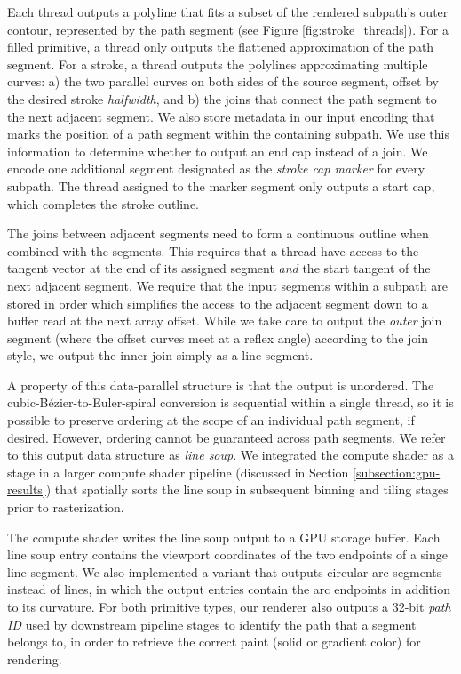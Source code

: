 \documentclass[sigconf]{acmart}
\begin{document}
Each thread outputs a polyline that fits a subset of the rendered subpath's outer contour, represented by the path segment (see Figure \ref{fig:stroke_threads}). For a filled primitive, a thread only outputs the flattened approximation of the path segment. For a stroke, a thread outputs the polylines approximating multiple curves: a) the two parallel curves on both sides of the source segment, offset by the desired stroke \emph{halfwidth}, and b) the joins that connect the path segment to the next adjacent segment. We also store metadata in our input encoding that marks the position of a path segment within the containing subpath. We use this information to determine whether to output an end cap instead of a join. We encode one additional segment designated as the \emph{stroke cap marker} for every subpath. The thread assigned to the marker segment only outputs a start cap, which completes the stroke outline.

The joins between adjacent segments need to form a continuous outline when combined with the segments. This requires that a thread have access to the tangent vector at the end of its assigned segment \emph{and} the start tangent of the next adjacent segment. We require that the input segments within a subpath are stored in order which simplifies the access to the adjacent segment down to a buffer read at the next array offset. While we take care to output the \emph{outer} join segment (where the offset curves meet at a reflex angle) according to the join style, we output the inner join simply as a line segment.

A property of this data-parallel structure is that the output is unordered. The cubic-Bézier-to-Euler-spiral conversion is sequential within a single thread, so it is possible to preserve ordering at the scope of an individual path segment, if desired. However, ordering cannot be guaranteed across path segments. We refer to this output data structure as \emph{line soup}. We integrated the compute shader as a stage in a larger compute shader pipeline (discussed in Section \ref{subsection:gpu-results}) that spatially sorts the line soup in subsequent binning and tiling stages prior to rasterization.

The compute shader writes the line soup output to a GPU storage buffer. Each line soup entry contains the viewport coordinates of the two endpoints of a singe line segment. We also implemented a variant that outputs circular arc segments instead of lines, in which the output entries contain the arc endpoints in addition to its curvature. For both primitive types, our renderer also outputs a 32-bit \emph{path ID} used by downstream pipeline stages to identify the path that a segment belongs to, in order to retrieve the correct paint (solid or gradient color) for rendering.
\end{document}
